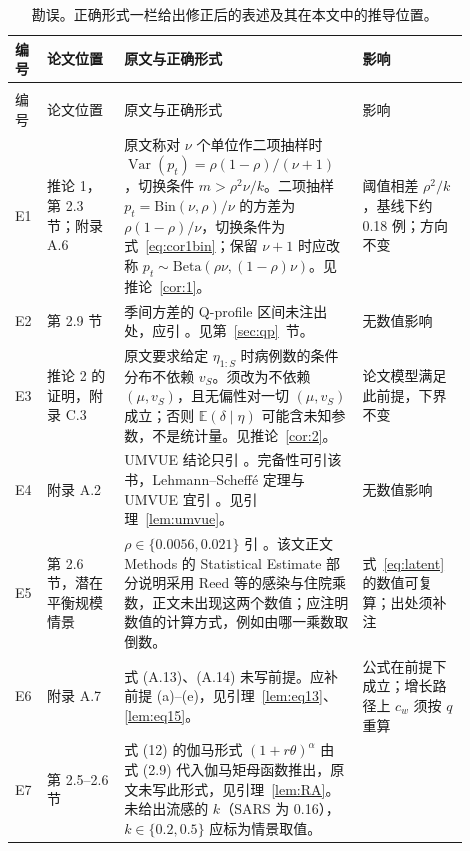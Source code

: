 \documentclass[fontset=none,11pt,a4paper,fleqn]{ctexart}
\numberwithin{equation}{section}
\theoremstyle{zhthm}
\theoremstyle{zhrem}
\newcommand{\E}{\mathbb{E}}
\newcommand{\Var}{\operatorname{Var}}
\newcommand{\Bin}{\mathrm{Bin}}
\begin{document}
\begin{small}
\setlength{\tabcolsep}{6pt}
\renewcommand{\arraystretch}{1.15}
\begin{longtable}{@{}>{\raggedright\arraybackslash}p{0.055\linewidth}>{\raggedright\arraybackslash}p{0.16\linewidth}p{0.46\linewidth}>{\raggedright\arraybackslash}p{0.22\linewidth}@{}}
\caption{勘误。正确形式一栏给出修正后的表述及其在本文中的推导位置。}\label{tab:errata}\\
\toprule
编号 & 论文位置 & 原文与正确形式 & 影响 \\
\midrule
\endfirsthead
\multicolumn{4}{@{}l}{\small 表~\ref{tab:errata}（续）}\\
\toprule
编号 & 论文位置 & 原文与正确形式 & 影响 \\
\midrule
\endhead
\bottomrule
\endfoot
E1 & 推论 1，第 2.3 节；附录 A.6 &
原文称对 $\nu$ 个单位作二项抽样时 $\Var(p_t)=\rho(1-\rho)/(\nu+1)$，切换条件 $m>\rho^2\nu/k$。二项抽样 $p_t=\Bin(\nu,\rho)/\nu$ 的方差为 $\rho(1-\rho)/\nu$，切换条件为式~\eqref{eq:cor1bin}；保留 $\nu+1$ 时应改称 $p_t\sim\mathrm{Beta}(\rho\nu,(1-\rho)\nu)$。见推论~\ref{cor:1}。 &
阈值相差 $\rho^2/k$，基线下约 0.18 例；方向不变 \\
\addlinespace
E2 & 第 2.9 节 &
季间方差的 Q-profile 区间未注出处，应引 \citet{viechtbauer2007confidence}。见第~\ref{sec:qp}~节。 &
无数值影响 \\
\addlinespace
E3 & 推论 2 的证明，附录 C.3 &
原文要求给定 $\eta_{1:S}$ 时病例数的条件分布不依赖 $v_S$。须改为不依赖 $(\mu,v_S)$，且无偏性对一切 $(\mu,v_S)$ 成立；否则 $\E(\delta\mid\eta)$ 可能含未知参数，不是统计量。见推论~\ref{cor:2}。 &
论文模型满足此前提，下界不变 \\
\addlinespace
E4 & 附录 A.2 &
UMVUE 结论只引 \citet{lehmann2005testing}。完备性可引该书，Lehmann--Scheffé 定理与 UMVUE 宜引 \citet{lehmann1998theory}。见引理~\ref{lem:umvue}。 &
无数值影响 \\
\addlinespace
E5 & 第 2.6 节，潜在平衡规模情景 &
$\rho\in\{0.0056,0.021\}$ 引 \citet{tokars2018seasonal}。该文正文 Methods 的 Statistical Estimate 部分说明采用 Reed 等的感染与住院乘数，正文未出现这两个数值；应注明数值的计算方式，例如由哪一乘数取倒数。 &
式~\eqref{eq:latent} 的数值可复算；出处须补注 \\
\addlinespace
E6 & 附录 A.7 &
式 (A.13)、(A.14) 未写前提。应补前提 (a)--(e)，见引理~\ref{lem:eq13}、\ref{lem:eq15}。 &
公式在前提下成立；增长路径上 $c_w$ 须按 $q$ 重算 \\
\addlinespace
E7 & 第 2.5--2.6 节 &
式 (12) 的伽马形式 $(1+r\theta)^\alpha$ 由 \citet{wallinga2007how} 式 (2.9) 代入伽马矩母函数推出，原文未写此形式，见引理~\ref{lem:RA}。\citet{lloydsmith2005superspreading} 未给出流感的 $k$（SARS 为 0.16），$k\in\{0.2,0.5\}$ 应标为情景取值。 &

\end{longtable}
\end{small}
\end{document}
